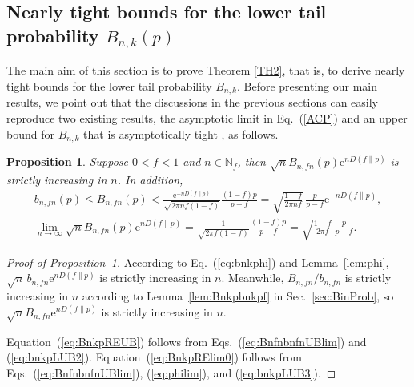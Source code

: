 \documentclass[aop]{imsart}
\theoremstyle{plain}
\newtheorem{proposition}[theorem]{Proposition}
\theoremstyle{remark}
\newcommand{\rme}{\mathrm{e}}
\newcommand{\bbN}{\mathbb{N}}
\newcommand{\1}{\operatorname{\uppercase\expandafter{\romannumeral1}}}
\newcommand{\2}{\operatorname{\uppercase\expandafter{\romannumeral2}}}
\newcommand{\3}{\operatorname{\uppercase\expandafter{\romannumeral3}}}
\newcommand{\4}{\operatorname{\uppercase\expandafter{\romannumeral4}}}
\newcommand{\5}{\operatorname{\uppercase\expandafter{\romannumeral5}}}
\newcommand{\6}{\operatorname{\uppercase\expandafter{\romannumeral6}}}
\newcommand{\7}{\operatorname{\uppercase\expandafter{\romannumeral7}}}
\newcommand{\8}{\operatorname{\uppercase\expandafter{\romannumeral8}}}
\newcommand{\9}{\operatorname{\uppercase\expandafter{\romannumeral9}}}
\newcommand{\eref}[1]{Eq.~\textup{(\ref{#1})}}
\newcommand{\Eref}[1]{Equation~\textup{(\ref{#1})}}
\newcommand{\eqsref}[2]{Eqs.~(\ref{#1}) and (\ref{#2})}
\newcommand{\eqssref}[3]{Eqs.~(\ref{#1}), (\ref{#2}), and (\ref{#3})}
\newcommand{\lref}[1]{Lemma~\ref{#1}}
\newcommand{\pref}[1]{Proposition~\ref{#1}}
\newcommand{\sref}[1]{Sec.~\ref{#1}}
\begin{document}
\subsection{\label{sec:TailBnkp}Nearly tight bounds for the lower tail probability $B_{n,k}(p)$}
The main aim of this section is to prove Theorem \ref{TH2}, that is, 
to derive nearly tight bounds for the lower tail probability $B_{n,k}$. 
Before presenting our main results, we point out that 
the discussions in the previous sections can easily reproduce two existing results, the asymptotic limit in \eref{ACP} \cite{AG,BlacH59,BahaR60,DembZ10} and 
an upper bound for $B_{n,k}$ that is asymptotically tight  \cite{Ferr21}, as follows.

\begin{proposition}\label{pro:BnfRE}
	Suppose  $0<f<1$ and $n\in \bbN_f$, then   $\sqrt{n}B_{n,fn}(p)\rme^{nD(f\| p)}$ is strictly increasing in $n$. In addition,
	\begin{gather}
	b_{n,fn}(p)\leq  B_{n,fn}(p)< \frac{\rme^{-nD(f\| p)}}{\sqrt{2\pi n f(1-f)}}\frac{(1-f)p}{p-f}=\sqrt{\frac{1-f}{2\pi n f}}\,\frac{p}{p-f}\rme^{-nD(f\| p)}
	, \label{eq:BnkpREUB}\\
	\lim_{n\to \infty} \sqrt{n} B_{n,fn}(p)\rme^{nD(f\| p)}=\frac{1}{\sqrt{2\pi  f(1-f)}}\frac{(1-f)p}{p-f}=\sqrt{\frac{1-f}{2\pi f}}\,\frac{p}{p-f}. \label{eq:BnkpRElim0}
	\end{gather} 
\end{proposition}

\begin{proof}[Proof of \pref{pro:BnfRE}]
	According to \eref{eq:bnkphi} and \lref{lem:phi},  $\sqrt{n}\,b_{n,fn}\rme^{nD(f\| p)}$	is strictly increasing in $n$.  Meanwhile,  $B_{n,fn}/b_{n,fn}$ is strictly increasing in $n$  according to \lref{lem:Bnkpbnkpf} in \sref{sec:BinProb}, so $\sqrt{n}B_{n,fn}\rme^{nD(f\| p)}$ is strictly increasing in $n$. 
	
	
	\Eref{eq:BnkpREUB} follows from  \eqsref{eq:BnfnbnfnUBlim}{eq:bnkpLUB2}.
	\Eref{eq:BnkpRElim0} follows from \eqssref{eq:BnfnbnfnUBlim}{eq:philim}{eq:bnkpLUB3}.
\end{proof}
\end{document}
